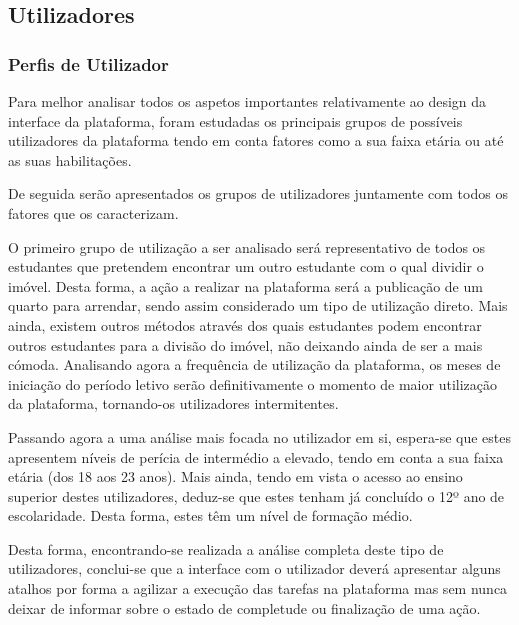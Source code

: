 \subsection{Utilizadores}



\subsubsection{Perfis de Utilizador}

Para melhor analisar todos os aspetos importantes relativamente ao design da interface da plataforma, foram estudadas os principais grupos de possíveis utilizadores da plataforma tendo em conta fatores como a sua faixa etária ou até as suas habilitações.

De seguida serão apresentados os grupos de utilizadores juntamente com todos os fatores que os caracterizam.

O primeiro grupo de utilização a ser analisado será representativo de todos os estudantes que pretendem encontrar um outro estudante com o qual dividir o imóvel. Desta forma, a ação a realizar na plataforma será a publicação de um quarto para arrendar, sendo assim considerado um tipo de utilização direto. Mais ainda, existem outros métodos através dos quais estudantes podem encontrar outros estudantes para a divisão do imóvel, não deixando ainda de ser a mais cómoda. Analisando agora a frequência de utilização da plataforma, os meses de iniciação do período letivo serão definitivamente o momento de maior utilização da plataforma, tornando-os utilizadores intermitentes.

Passando agora a uma análise mais focada no utilizador em si, espera-se que estes apresentem níveis de perícia de intermédio a elevado, tendo em conta a sua faixa etária (dos 18 aos 23 anos). Mais ainda, tendo em vista o acesso ao ensino superior destes utilizadores, deduz-se que estes tenham já concluído o 12º ano de escolaridade. Desta forma, estes têm um nível de formação médio.

Desta forma, encontrando-se realizada a análise completa deste tipo de utilizadores, conclui-se que a interface com o utilizador deverá apresentar alguns atalhos por forma a agilizar a execução das tarefas na plataforma mas sem nunca deixar de informar sobre o estado de completude ou finalização de uma ação.

